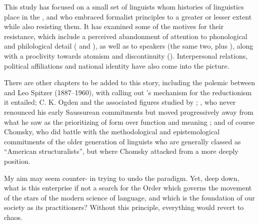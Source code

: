 \documentclass[output=paper]{langscibook}
\begin{document}
This study has focused on a small set of linguists whom histories of linguistics place in the , and who embraced formalist principles to a greater or lesser extent while also resisting them. It has examined some of the motives for their resistance, which include a perceived abandonment of attention to phonological and philological detail ({\Benveniste} and {\Sauvageot}), as well as to speakers (the same two, plus {\Martinet}), along with a proclivity towards atomism and discontinuity ({\Meschonnic}). Interpersonal relations, political affiliations and national identity have also come into the picture.

There are other chapters to be added to this story, including the polemic between {\Bloomfield} and Leo Spitzer (1887--1960), with \citet{Spitzer1944} calling out {\Bloomfield}'s mechanism for the reductionism it entailed; C. K. Ogden and the associated figures studied by \citet{McElvenny2018}; {\Hjelmslev}, who never renounced his early Saussurean commitments but moved progressively away from what he saw as the prioritizing of form over function and meaning \citep{Joseph2018hj}; and of course Chomsky, who did battle with the methodological and epistemological commitments of the older generation of linguists who are generally classed as ``American structuralists'', but where Chomsky attacked from a more deeply  position.

My aim may seem counter- in trying to undo the paradigm. Yet, deep down, what is this enterprise if not a search for the Order which governs the movement of the stars of the modern science of language, and which is the foundation of our society as its practitioners? Without this principle, everything would revert to chaos.

\sloppy
\printbibliography[heading=subbibliography,notkeyword=this]
\end{document}

